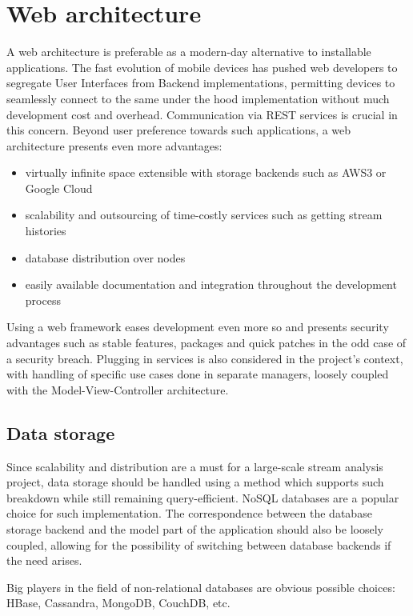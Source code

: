 \documentclass[12pt,a4paper,twoside]{report}
\begin{document}
\section{Web architecture}
A web architecture is preferable as a modern-day alternative to installable applications. The fast evolution of mobile devices has pushed web developers to segregate User Interfaces from Backend implementations, permitting devices to seamlessly connect to the same under the hood implementation without much development cost and overhead. Communication via REST services is crucial in this concern. Beyond user preference towards such applications, a web architecture presents even more advantages:

\begin{itemize}
\item virtually infinite space extensible with storage backends such as AWS3 or Google Cloud
\item scalability and outsourcing of time-costly services such as getting stream histories
\item database distribution over nodes
\item easily available documentation and integration throughout the development process
\end{itemize} 

Using a web framework eases development even more so and presents security advantages such as stable features, packages and quick patches in the odd case of a security breach. Plugging in services is also considered in the project's context, with handling of specific use cases done in separate managers, loosely coupled with the Model-View-Controller architecture.

\subsection{Data storage}
Since scalability and distribution are a must for a large-scale stream analysis project, data storage should be handled using a method which supports such breakdown while still remaining query-efficient. NoSQL databases are a popular choice for such implementation. The correspondence between the database storage backend and the model part of the application should also be loosely coupled, allowing for the possibility of switching between database backends if the need arises.

Big players in the field of non-relational databases are obvious possible choices: HBase, Cassandra, MongoDB, CouchDB, etc.
\end{document}

